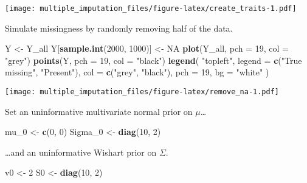 \documentclass[]{article}
\newenvironment{Shaded}{\begin{snugshade}}{\end{snugshade}}
\newcommand{\DataTypeTok}[1]{\textcolor[rgb]{0.13,0.29,0.53}{#1}}
\newcommand{\DecValTok}[1]{\textcolor[rgb]{0.00,0.00,0.81}{#1}}
\newcommand{\KeywordTok}[1]{\textcolor[rgb]{0.13,0.29,0.53}{\textbf{#1}}}
\newcommand{\NormalTok}[1]{#1}
\newcommand{\OtherTok}[1]{\textcolor[rgb]{0.56,0.35,0.01}{#1}}
\newcommand{\StringTok}[1]{\textcolor[rgb]{0.31,0.60,0.02}{#1}}
\begin{document}
\texttt{[image: multiple\_imputation\_files/figure-latex/create\_traits-1.pdf]}

Simulate missingness by randomly removing half of the data.

\begin{Shaded}
\begin{Highlighting}[]
\NormalTok{Y <-}\StringTok{ }\NormalTok{Y_all}
\NormalTok{Y[}\KeywordTok{sample.int}\NormalTok{(}\DecValTok{2000}\NormalTok{, }\DecValTok{1000}\NormalTok{)] <-}\StringTok{ }\OtherTok{NA}
\KeywordTok{plot}\NormalTok{(Y_all, }\DataTypeTok{pch =} \DecValTok{19}\NormalTok{, }\DataTypeTok{col =} \StringTok{"grey"}\NormalTok{)}
\KeywordTok{points}\NormalTok{(Y, }\DataTypeTok{pch =} \DecValTok{19}\NormalTok{, }\DataTypeTok{col =} \StringTok{"black"}\NormalTok{)}
\KeywordTok{legend}\NormalTok{(}
  \StringTok{"topleft"}\NormalTok{,}
  \DataTypeTok{legend =} \KeywordTok{c}\NormalTok{(}\StringTok{"True missing"}\NormalTok{, }\StringTok{"Present"}\NormalTok{),}
  \DataTypeTok{col =} \KeywordTok{c}\NormalTok{(}\StringTok{"grey"}\NormalTok{, }\StringTok{"black"}\NormalTok{),}
  \DataTypeTok{pch =} \DecValTok{19}\NormalTok{,}
  \DataTypeTok{bg =} \StringTok{"white"}
\NormalTok{)}
\end{Highlighting}
\end{Shaded}

\texttt{[image: multiple\_imputation\_files/figure-latex/remove\_na-1.pdf]}

Set an uninformative multivariate normal prior on \(\mu\)\ldots{}

\begin{Shaded}
\begin{Highlighting}[]
\NormalTok{mu_}\DecValTok{0}\NormalTok{ <-}\StringTok{ }\KeywordTok{c}\NormalTok{(}\DecValTok{0}\NormalTok{, }\DecValTok{0}\NormalTok{)}
\NormalTok{Sigma_}\DecValTok{0}\NormalTok{ <-}\StringTok{ }\KeywordTok{diag}\NormalTok{(}\DecValTok{10}\NormalTok{, }\DecValTok{2}\NormalTok{)}
\end{Highlighting}
\end{Shaded}

\ldots{}and an uninformative Wishart prior on \(\Sigma\).

\begin{Shaded}
\begin{Highlighting}[]
\NormalTok{v0 <-}\StringTok{ }\DecValTok{2}
\NormalTok{S0 <-}\StringTok{ }\KeywordTok{diag}\NormalTok{(}\DecValTok{10}\NormalTok{, }\DecValTok{2}\NormalTok{)}
\end{Highlighting}
\end{Shaded}
\end{document}
